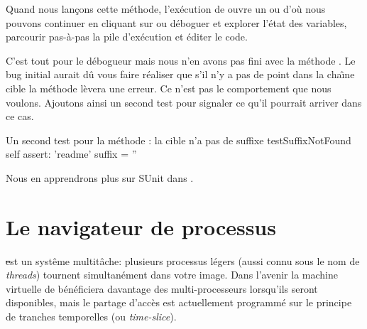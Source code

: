 \documentclass[a4paper,10pt,twoside]{book}
\begin{document}
Quand nous lan\c{c}ons cette m\'ethode, l'ex\'ecution de  ouvre un  ou \emph{} d'o\`u nous pouvons continuer 
en cliquant sur 
ou d\'eboguer et explorer l'\'etat des variables, parcourir pas-\`a-pas la pile d'ex\'ecution et \'editer le code.

C'est tout pour le d\'ebogueur mais nous n'en avons pas fini avec la m\'ethode .
Le bug initial aurait d\^u vous faire r\'ealiser que s'il n'y a pas de point dans la cha\^{\i}ne cible la m\'ethode  l\`evera une erreur.
Ce n'est pas le comportement que nous voulons. Ajoutons ainsi un second test
pour signaler ce qu'il pourrait arriver dans ce cas.  

\begin{method}[testNoSuffix]{Un second test pour la m\'ethode : la cible n'a pas de suffixe}
testSuffixNotFound
	self assert: 'readme' suffix = ''
\end{method}



Nous en apprendrons plus sur SUnit dans .


\section{Le navigateur de processus}

\st est un syst\^eme multit\^ache: plusieurs processus l\'egers (aussi
connu sous le nom de \emph{threads}) tournent simultan\'ement dans
votre image.
Dans l'avenir la machine virtuelle de \sq b\'en\'eficiera davantage
des multi-processeurs lorsqu'ils seront disponibles, mais le partage
d'acc\`es est actuellement programm\'e sur le principe de
 tranches temporelles (ou \emph{time-slice}).
\end{document}
